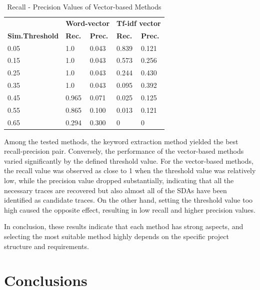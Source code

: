 \documentclass[conference]{IEEEtran}
\begin{document}
\begin{table}[htb]
\centering
\vspace{1ex}
\begin{tabular}{l l l l l}

\textbf  & \multicolumn{2}{c}{\textbf{Word-vector}} &  \multicolumn{2}{c}{\textbf{Tf-idf vector}}\\
\textbf{Sim.Threshold   } & \textbf{Rec.} &\textbf{Prec.} &  \textbf{Rec.} &\textbf{Prec.}\\

0.05    & 1.0 & 0.043 & 0.839 & 0.121 \\
0.15    & 1.0 & 0.043 & 0.573 & 0.256 \\
0.25    & 1.0 & 0.043 & 0.244 & 0.430 \\
0.35    & 1.0 & 0.043 & 0.095 & 0.392 \\
0.45    & 0.965 & 0.071 & 0.025 & 0.125 \\
0.55    & 0.865 & 0.100 & 0.013 & 0.121 \\
0.65    & 0.294 & 0.300 & 0 & 0 \\

\end{tabular}
\caption{Recall - Precision Values of Vector-based Methods}
\end{table}

Among the tested methods, the keyword extraction method yielded the best recall-precision pair. Conversely, the performance of the vector-based methods varied significantly by the defined threshold value. For the vector-based methods, the recall value was observed as close to 1 when the threshold value was relatively low, while the precision value dropped substantially, indicating that all the necessary traces are recovered but also almost all of the SDAs have been identified as candidate traces. On the other hand, setting the threshold value too high caused the opposite effect, resulting in low recall and higher precision values. 

In conclusion, these results indicate that each method has strong aspects, and selecting the most suitable method highly depends on the specific project structure and requirements. 



\section{Conclusions}\label{section:conclusion}
\end{document}
